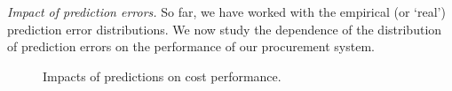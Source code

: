 

\emph{Impact of prediction errors.} So far, we have worked with the
empirical (or `real') prediction error distributions. We now study the
dependence of the distribution of prediction errors on the performance
of our procurement system.

\begin{figure}[!h]    
	\centering
	\caption{Impacts of predictions on cost performance.}
	\label{fig:impactOfErrorDistribution}
\end{figure}

